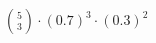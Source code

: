 \documentclass[preview]{standalone}
\begin{document}
\begin{align*}
{5 \choose 3} \cdot (0.7)^3 \cdot (0.3)^2
\end{align*}
\end{document}
